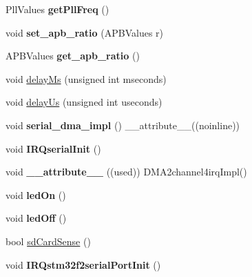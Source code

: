 \begin{DoxyCompactItemize}
\item 
\hypertarget{group___hardware_ga05de6820e307a66d6d5ef359ed869479}{Pll\-Values {\bfseries get\-Pll\-Freq} ()}\label{group___hardware_ga05de6820e307a66d6d5ef359ed869479}

\item 
\hypertarget{group___hardware_ga7c445244914cd7af079ac29fed41ecd6}{void {\bfseries set\-\_\-apb\-\_\-ratio} (A\-P\-B\-Values r)}\label{group___hardware_ga7c445244914cd7af079ac29fed41ecd6}

\item 
\hypertarget{group___hardware_ga7b210ba2df2b14811be3b416c0243e76}{A\-P\-B\-Values {\bfseries get\-\_\-apb\-\_\-ratio} ()}\label{group___hardware_ga7b210ba2df2b14811be3b416c0243e76}

\item 
void \hyperlink{group___interfaces_ga9d13aceddc0481fd1077e6fdfb31f9a7}{delay\-Ms} (unsigned int mseconds)
\item 
void \hyperlink{group___interfaces_ga244f9474d20ffd5d905855f68aa3114f}{delay\-Us} (unsigned int useconds)
\item 
\hypertarget{namespacemiosix_a8c638bc03678ad62b4b198427afdcbc4}{void {\bfseries serial\-\_\-dma\-\_\-impl} () \-\_\-\-\_\-attribute\-\_\-\-\_\-((noinline))}\label{namespacemiosix_a8c638bc03678ad62b4b198427afdcbc4}

\item 
\hypertarget{namespacemiosix_a644f54037f2d2ddd48d145defb6b29af}{void {\bfseries I\-R\-Qserial\-Init} ()}\label{namespacemiosix_a644f54037f2d2ddd48d145defb6b29af}

\item 
\hypertarget{namespacemiosix_ae64ec06e379125da1996cad4f28314c5}{void {\bfseries \-\_\-\-\_\-attribute\-\_\-\-\_\-} ((used)) D\-M\-A2channel4irq\-Impl()}\label{namespacemiosix_ae64ec06e379125da1996cad4f28314c5}

\item 
\hypertarget{group___hardware_gae1c05bf01644e238fbae56e5d6f23e8b}{void {\bfseries led\-On} ()}\label{group___hardware_gae1c05bf01644e238fbae56e5d6f23e8b}

\item 
\hypertarget{group___hardware_ga7ece6a6978a1d814979dcaadd7498edb}{void {\bfseries led\-Off} ()}\label{group___hardware_ga7ece6a6978a1d814979dcaadd7498edb}

\item 
bool \hyperlink{group___hardware_ga4a7aa35796ec8da996784c562b9e12ac}{sd\-Card\-Sense} ()
\item 
\hypertarget{namespacemiosix_a4ea45a2ed6c71b903eddcaba89578d1a}{void {\bfseries I\-R\-Qstm32f2serial\-Port\-Init} ()}\label{namespacemiosix_a4ea45a2ed6c71b903eddcaba89578d1a}


\end{DoxyCompactItemize}
